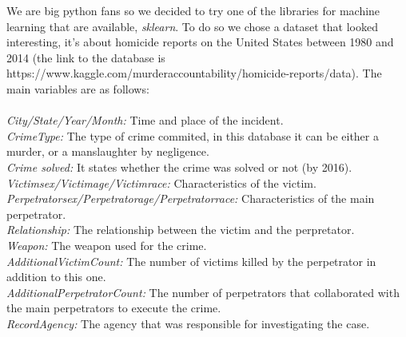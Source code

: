 \documentclass[12pt]{report}
\begin{document}
We are big python fans so we decided to try one of the libraries for machine learning that are available, \textit{sklearn}. To do so we chose a dataset that looked interesting, it's about homicide reports on the United States between 1980 and 2014 (the link to the database is https://www.kaggle.com/murderaccountability/homicide-reports/data). The main variables are as follows:
\\\\
\emph{City/State/Year/Month:} Time and place of the incident.\\
\emph{CrimeType:} The type of crime commited, in this database it can be either a murder, or a manslaughter by negligence.\\
\emph{Crime solved:} It states whether the crime was solved or not (by 2016).\\
\emph{Victim\textunderscore sex/Victim\textunderscore age/Victim\textunderscore race:} Characteristics of the victim.\\
\emph{Perpetrator\textunderscore sex/Perpetrator\textunderscore age/Perpetrator\textunderscore race:} Characteristics of the main perpetrator.\\
\emph{Relationship:} The relationship between the victim and the perpretator.\\
\emph{Weapon:} The weapon used for the crime.\\
\emph{Additional\textunderscore Victim\textunderscore Count:} The number of victims killed by the perpetrator in addition to this one.\\
\emph{Additional\textunderscore Perpetrator\textunderscore Count:} The number of perpetrators that collaborated with the main perpetrators to execute the crime.\\
\emph{Record\textunderscore Agency:} The agency that was responsible for investigating the case.

%
\end{document}
